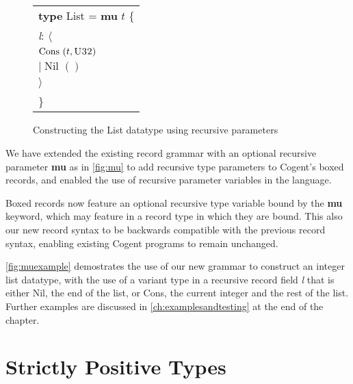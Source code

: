 \begin{figure}
    \centering
    \begin{tabular}{l}
        \textbf{type} List = \textbf{mu} $t$ \{ \\
            \phantom{x}\hspace{2em}\textit{l}: $\langle\;$ \\
            \phantom{x}\hspace{4em} $\text{Cons } (t,\textsc{U32})\;$ \\
            \phantom{x}\hspace{3.7em}$|\; \text{Nil } ()\;$ \\
            \phantom{x}\hspace{2em}$\rangle$ \\
        \} 
    \end{tabular}
    \vspace{2em}
    \caption{Constructing the List datatype using recursive parameters}
    \label{fig:muexample}
\end{figure}

We have extended the existing record grammar with an optional recursive parameter \textbf{mu} as in
\autoref{fig:mu} to add recursive type parameters to Cogent's boxed records, and enabled the use
of recursive parameter variables in the language.

Boxed records now feature an optional recursive type variable bound by the \textbf{mu} keyword, which may
feature in a record type in which they are bound. This also our new record syntax to be backwards
compatible with the previous record syntax, enabling existing Cogent programs to remain unchanged.

\autoref{fig:muexample} demostrates the use of our new grammar to construct an integer list datatype,
with the use of a variant type in a recursive record field \textit{l} that is either Nil,
the end of the list, or Cons, the current integer and the rest of the list. Further
examples are discussed in \autoref{ch:examplesandtesting} at the end of the chapter.

\section{Strictly Positive Types}


